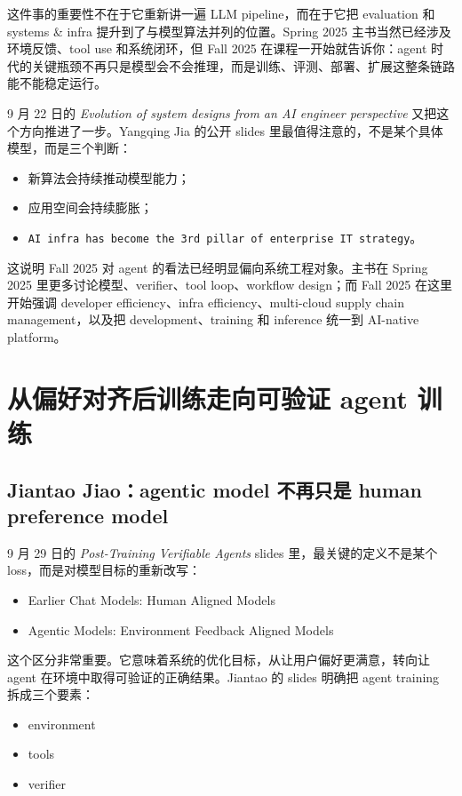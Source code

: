 \documentclass[11pt]{ctexbook}
\begin{document}
这件事的重要性不在于它重新讲一遍 LLM pipeline，而在于它把 evaluation 和 systems \& infra 提升到了与模型算法并列的位置。Spring 2025 主书当然已经涉及环境反馈、tool use 和系统闭环，但 Fall 2025 在课程一开始就告诉你：agent 时代的关键瓶颈不再只是模型会不会推理，而是训练、评测、部署、扩展这整条链路能不能稳定运行。

9 月 22 日的 \emph{Evolution of system designs from an AI engineer perspective} 又把这个方向推进了一步。Yangqing Jia 的公开 slides 里最值得注意的，不是某个具体模型，而是三个判断：

\begin{itemize}
\item 新算法会持续推动模型能力；
\item 应用空间会持续膨胀；
\item \texttt{AI infra has become the 3rd pillar of enterprise IT strategy}。
\end{itemize}

这说明 Fall 2025 对 agent 的看法已经明显偏向系统工程对象。主书在 Spring 2025 里更多讨论模型、verifier、tool loop、workflow design；而 Fall 2025 在这里开始强调 developer efficiency、infra efficiency、multi-cloud supply chain management，以及把 development、training 和 inference 统一到 AI-native platform。

\section{从偏好对齐后训练走向可验证 agent 训练}

\subsection{Jiantao Jiao：agentic model 不再只是 human preference model}

9 月 29 日的 \emph{Post-Training Verifiable Agents} slides 里，最关键的定义不是某个 loss，而是对模型目标的重新改写：

\begin{itemize}
\item Earlier Chat Models: Human Aligned Models
\item Agentic Models: Environment Feedback Aligned Models
\end{itemize}

这个区分非常重要。它意味着系统的优化目标，从让用户偏好更满意，转向让 agent 在环境中取得可验证的正确结果。Jiantao 的 slides 明确把 agent training 拆成三个要素：

\begin{itemize}
\item environment
\item tools
\item verifier
\end{itemize}
\end{document}
